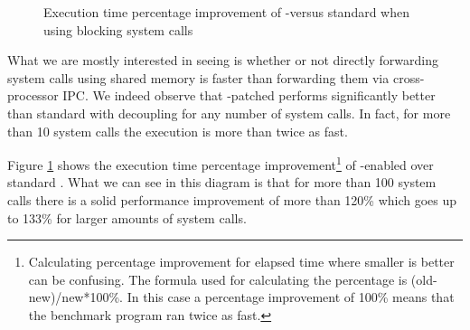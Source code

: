 \newcommand{\Ea}{\the\numexpr(\Ca-\Da)*100/\Da\relax}
\newcommand{\Eb}{\the\numexpr(\Cb-\Db)*100/\Db\relax}
\newcommand{\Ec}{\the\numexpr(\Cc-\Dc)*100/\Dc\relax}
\newcommand{\Ed}{\the\numexpr(\Cd-\Dd)*100/\Dd\relax}
\newcommand{\Ee}{\the\numexpr(\Ce-\De)*100/\De\relax}
\newcommand{\Ef}{\the\numexpr(\Cf-\Df)*100/\Df\relax}

\begin{figure}[h!]
\caption{Execution time percentage improvement of \llinux-\memsc versus
  standard \llinux when using blocking system calls}
\label{fig:block_single_per}
\end{figure}

What we are mostly interested in seeing is whether or not directly forwarding
system calls using shared memory is faster than forwarding them via
cross-processor IPC. We indeed observe that \memsc-patched \llinux performs
significantly better than standard \llinux with decoupling for any number of
system calls. In fact, for more than 10 system calls the execution is more than
twice as fast.

Figure \ref{fig:block_single_per} shows the execution time percentage
improvement\footnote{ Calculating percentage improvement for elapsed time where
smaller is better can be confusing. The formula used for calculating the
percentage is (old-new)/new*100\%. In this case a percentage improvement of
100\% means that the benchmark program ran twice as fast. } of \memsc-enabled
\llinux over standard \llinux. What we can see in this diagram is that for more
than 100 system calls there is a solid performance improvement of more than
120\% which goes up to 133\% for larger amounts of system calls.

